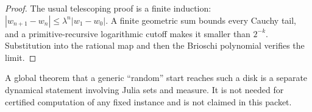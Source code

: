 \begin{proof}
The usual telescoping proof is a finite induction:
\(|w_{n+1}-w_n|\le\lambda^n|w_1-w_0|\).  A finite geometric sum bounds every
Cauchy tail, and a primitive-recursive logarithmic cutoff makes it smaller than
\(2^{-k}\).  Substitution into the rational map and then the Brioschi
polynomial verifies the limit.
\end{proof}

A global theorem that a generic ``random'' start reaches such a disk is a
separate dynamical statement involving Julia sets and measure.  It is not
needed for certified computation of any fixed instance and is not claimed in
this packet.
